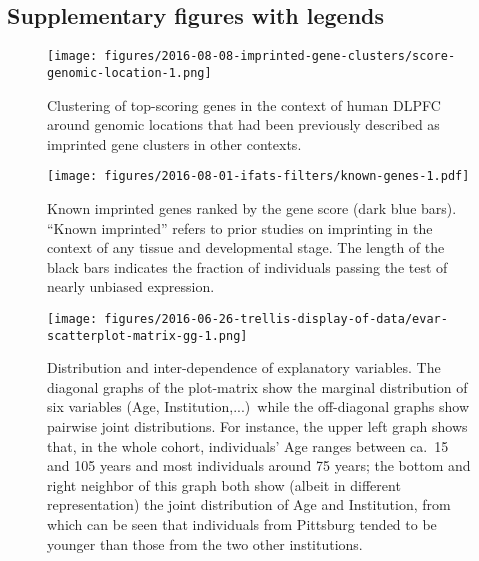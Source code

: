 \documentclass[letterpaper]{article}
\begin{document}
\subsection{Supplementary figures with legends}

\setcounter{figure}{0}
\makeatletter 
\renewcommand{\thefigure}{S\@arabic\c@figure}
\makeatother

\begin{figure}[H]
\begin{center}
\texttt{[image: figures/2016-08-08-imprinted-gene-clusters/score-genomic-location-1.png]}
\end{center}
\caption{
Clustering of top-scoring genes in the context of human DLPFC around genomic locations that
had been previously described as imprinted gene clusters in other contexts.
}
\label{fig:clusters}
\end{figure}

\begin{figure}[H]
\begin{center}
\texttt{[image: figures/2016-08-01-ifats-filters/known-genes-1.pdf]}
\caption{Known imprinted genes ranked by the gene score (dark blue bars).
``Known imprinted'' refers to prior studies on imprinting in the context of
any tissue and developmental stage.  The length of the
black bars indicates the fraction of individuals passing the test of nearly
unbiased expression.}
\label{fig:known-genes}
\end{center}
\end{figure}

\begin{figure}[H]
\begin{center}
\texttt{[image: figures/2016-06-26-trellis-display-of-data/evar-scatterplot-matrix-gg-1.png]}
\end{center}
\caption{
Distribution and inter-dependence of explanatory variables.  The diagonal graphs of the
plot-matrix show the marginal distribution of six variables (Age,
Institution,...)~while the off-diagonal graphs show pairwise joint
distributions.  For instance, the upper left graph shows that, in the whole
cohort, individuals' Age
ranges between ca.~15 and 105 years and most individuals around 75 years; the
bottom and right neighbor of this graph both show (albeit in different
representation) the joint distribution of Age and Institution, from which can
be seen that individuals from Pittsburg tended to be younger than those from
the two other institutions.
}
\label{fig:predictor-associations}
\end{figure}
\end{document}
